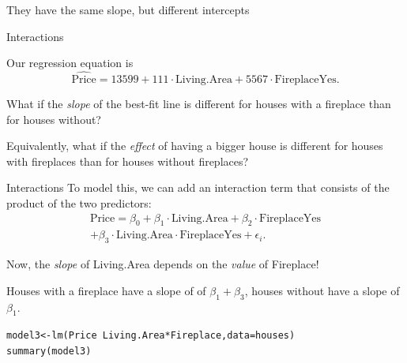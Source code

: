 \documentclass{beamer}\usepackage[]{graphicx}\usepackage[]{color}
\makeatletter
\newcommand{\hlopt}[1]{\textcolor[rgb]{1,0.894,0.769}{#1}}%
\newcommand{\hlstd}[1]{\textcolor[rgb]{1,0.894,0.769}{#1}}%
\newcommand{\hlkwb}[1]{\textcolor[rgb]{0.804,0.776,0.451}{#1}}%
\newcommand{\hlkwc}[1]{\textcolor[rgb]{0.78,0.941,0.545}{#1}}%
\newcommand{\hlkwd}[1]{\textcolor[rgb]{1,0.78,0.769}{#1}}%
\newenvironment{kframe}{%
 \def\at@end@of@kframe{}%
 \ifinner\ifhmode%
  \def\at@end@of@kframe{\end{minipage}}%
  \begin{minipage}{\columnwidth}%
 \fi\fi%
 \def\FrameCommand##1{\hskip\@totalleftmargin \hskip-\fboxsep
 \colorbox{shadecolor}{##1}\hskip-\fboxsep
     \hskip-\linewidth \hskip-\@totalleftmargin \hskip\columnwidth}%
 \MakeFramed {\advance\hsize-\width
   \@totalleftmargin\z@ \linewidth\hsize
   \@setminipage}}%
 {\par\unskip\endMakeFramed%
 \at@end@of@kframe}
\newenvironment{knitrout}{}{} %
\makeatother
\begin{document}
\begin{darkframes}
\begin{frame}
\begin{knitrout}
\end{knitrout}
    They have the same slope, but different intercepts
    \end{frame}

    \begin{frame}{Interactions}
      \begin{center}
        Our regression equation is
        \[
          \widehat{\text{Price}} = 13599
            + 111 \cdot\text{Living.Area}
            + 5567 \cdot\text{FireplaceYes}.
        \]

        \bigskip\pause

        What if the \emph{slope} of the best-fit line is different for houses with a fireplace than for houses without?

        \bigskip\pause

        Equivalently, what if the \emph{effect} of having a bigger house is different for houses with fireplaces than for houses without fireplaces?
      \end{center}
    \end{frame}

    \begin{frame}{Interactions}
      To model this, we can add an \alert{interaction term} that consists of the product of the two predictors:
      \begin{multline*}
        \text{Price} = \beta_0 + \beta_1\cdot\text{Living.Area} + \beta_2\cdot\text{FireplaceYes}
        \\ + \beta_3\cdot\text{Living.Area}\cdot\text{FireplaceYes} + \epsilon_i.
      \end{multline*}

      \pause\bigskip

      Now, the \emph{slope} of Living.Area depends on the \emph{value} of Fireplace!

      \bigskip
      Houses with a fireplace have a slope of of $\beta_1+\beta_3$, houses without have a slope of $\beta_1$.
    \end{frame}

    \begin{frame}[fragile]
      \fontsize{8}{8}\selectfont
\begin{knitrout}
\color{fgcolor}\begin{kframe}
\begin{alltt}
\hlstd{model3} \hlkwb{<-} \hlkwd{lm}\hlstd{(Price} \hlopt{~} \hlstd{Living.Area} \hlopt{*} \hlstd{Fireplace,} \hlkwc{data}\hlstd{=houses)}
\hlkwd{summary}\hlstd{(model3)}
\end{alltt}
\begin{verbatim}


\end{verbatim}
\end{kframe}
\end{knitrout}
\end{frame}
\end{darkframes}
\end{document}
